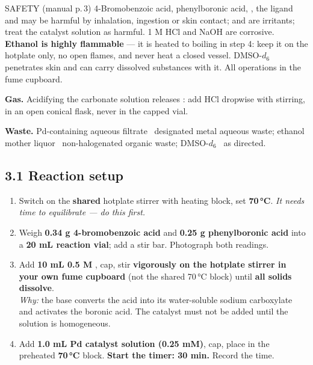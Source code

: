 \documentclass[10pt,a4paper]{article}
\begin{document}
\begin{callout}{SAFETY (manual p.\,3)}
4-Bromobenzoic acid, phenylboronic acid, , the ligand and  may be harmful by inhalation, ingestion or skin contact;  and  are irritants; treat the catalyst solution as harmful. 1 M HCl and NaOH are corrosive. \textbf{Ethanol is highly flammable} --- it is heated to boiling in step 4: keep it on the hotplate only, no open flames, and never heat a closed vessel. DMSO-$d_6$ penetrates skin and can carry dissolved substances with it. All operations in the fume cupboard.

\textbf{Gas.} Acidifying the carbonate solution releases : add HCl dropwise with stirring, in an open conical flask, never in the capped vial.

\textbf{Waste.} Pd-containing aqueous filtrate \textrightarrow\ designated metal aqueous waste; ethanol mother liquor \textrightarrow\ non-halogenated organic waste; DMSO-$d_6$ \textrightarrow\ as directed. 
\end{callout}

\newpage
{}

\subsection*{3.1 Reaction setup}
\begin{enumerate}[leftmargin=7mm,itemsep=1.2mm,label=\cbox\ \arabic*.]
\item Switch on the \textbf{shared} hotplate stirrer with heating block, set \textbf{70\,\si{\celsius}}. \emph{It needs time to equilibrate --- do this first.}
\item Weigh \textbf{0.34 g 4-bromobenzoic acid} and \textbf{0.25 g phenylboronic acid} into a \textbf{20 mL reaction vial}; add a stir bar. Photograph both readings.
\item Add \textbf{10 mL 0.5 M }, cap, stir \textbf{vigorously on the hotplate stirrer in your own fume cupboard} (not the shared 70\,\si{\celsius} block) until \textbf{all solids dissolve}.\\
{\footnotesize \emph{Why:} the base converts the acid into its water-soluble sodium carboxylate and activates the boronic acid. The catalyst must not be added until the solution is homogeneous.}
\item Add \textbf{1.0 mL Pd catalyst solution (0.25 mM)}, cap, place in the preheated \textbf{70\,\si{\celsius}} block. \textbf{Start the timer: 30 min.} Record the time.
\end{enumerate}
\end{document}
